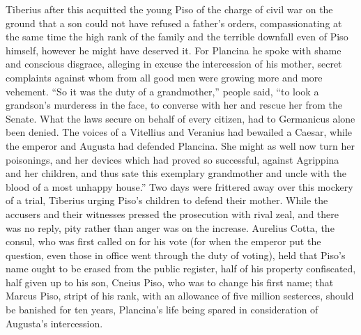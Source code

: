 Tiberius after this acquitted the young Piso of the charge of civil war on the ground that a son could not have refused a father's orders, compassionating at the same time the high rank of the family and the terrible downfall even of Piso himself, however he might have deserved it. For Plancina he spoke with shame and conscious disgrace, alleging in excuse the intercession of his mother, secret complaints against whom from all good men were growing more and more vehement. ``So it was the duty of a grandmother,'' people said, ``to look a grandson's murderess in the face, to converse with her and rescue her from the Senate. What the laws secure on behalf of every citizen, had to Germanicus alone been denied. The voices of a Vitellius and Veranius had bewailed a Caesar, while the emperor and Augusta had defended Plancina. She might as well now turn her poisonings, and her devices which had proved so successful, against Agrippina and her children, and thus sate this exemplary grandmother and uncle with the blood of a most unhappy house.'' Two days were frittered away over this mockery of a trial, Tiberius urging Piso's children to defend their mother. While the accusers and their witnesses pressed the prosecution with rival zeal, and there was no reply, pity rather than anger was on the increase. Aurelius Cotta, the consul, who was first called on for his vote (for when the emperor put the question, even those in office went through the duty of voting), held that Piso's name ought to be erased from the public register, half of his property confiscated, half given up to his son, Cneius Piso, who was to change his first name; that Marcus Piso, stript of his rank, with an allowance of five million sesterces, should be banished for ten years, Plancina's life being spared in consideration of Augusta's intercession.



